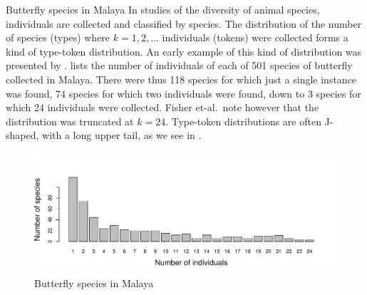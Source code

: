 \documentclass[11pt]{book}
\renewenvironment{knitrout}{\small\renewcommand{\baselinestretch}{.85}}{} %
\begin{document}
\begin{Example}[butterfly]{Butterfly species in Malaya}
In studies of the diversity of animal species, individuals are
collected and classified by species.
The distribution of the number of species (types) where $k = 1, 2, \dots$
individuals (tokens) were collected forms a kind of type-token distribution.
An early example of this kind of distribution was presented by
\citet{Fisher-etal:43}.
 lists the number of individuals of each of
501 species of butterfly collected in Malaya.
There were thus 118 species for which just a single instance was found,
74 species for which two individuals were found,
down to 3 species for which 24 individuals were collected.
Fisher et-al.\  note however that the distribution was truncated
at $k = 24$.
Type-token distributions are often J-shaped, with a long upper tail,
as we see in .


\begin{knitrout}
\color{fgcolor}\begin{kframe}
\begin{alltt}
 \hlstd{=}\hlstd{)}
 \hlstd{=}\hlstd{,} \hlstd{=}\hlstd{,}
        \hlstd{=}\hlstd{)}
\end{alltt}
\end{kframe}\begin{figure}[!htbp]


\centerline{\includegraphics[width=.9\textwidth]{ch03/fig/butterfly} }

\caption[Butterfly species in Malaya]{Butterfly species in Malaya\label{fig:butterfly}}
\end{figure}


\end{knitrout}

\end{Example}
\end{document}
